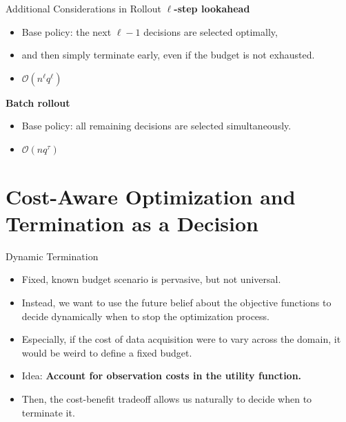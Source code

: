 \documentclass[9pt]{beamer}
\begin{document}
\begin{frame}{Additional Considerations in Rollout}
  \textbf{$\ell$-step lookahead}
  \begin{itemize}
    \item Base policy: the next $\ell-1$ decisions are selected optimally,
    \item and then simply terminate early, even if the budget is not exhausted.
    \item[$\Rightarrow$] $\mathcal{O}(n^\ell q^\ell)$ 
  \end{itemize}
  
  \vspace{1.0em}
  \textbf{Batch rollout}
  \begin{itemize}
    \item Base policy: all remaining decisions are selected simultaneously.
    \item[$\Rightarrow$] $\mathcal{O}(n q^\tau)$
  \end{itemize}
\end{frame}

\section{Cost-Aware Optimization and Termination as a Decision}
\begin{frame}{Dynamic Termination}
  \begin{itemize}
    \item Fixed, known budget scenario is pervasive, but not universal.
    \item Instead, we want to use the future belief about the objective functions to decide dynamically when to stop the optimization process.
    \item Especially, if the cost of data acquisition were to vary across the domain, it would be weird to define a fixed budget.
    \vspace{1.0em}
    \item Idea: \textbf{Account for observation costs in the utility function.}
    \item[$\Rightarrow$] Then, the cost-benefit tradeoff allows us naturally to decide when to terminate it.
  \end{itemize}
\end{frame}
\end{document}
